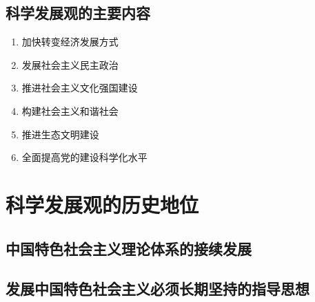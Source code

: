     \subsection{科学发展观的主要内容}
        \begin{enumerate}
            \item 加快转变经济发展方式
            \item 发展社会主义民主政治
            \item 推进社会主义文化强国建设
            \item 构建社会主义和谐社会
            \item 推进生态文明建设
            \item 全面提高党的建设科学化水平
        \end{enumerate}


\section{科学发展观的历史地位}
    \subsection{中国特色社会主义理论体系的接续发展}
    \subsection{发展中国特色社会主义必须长期坚持的指导思想}
